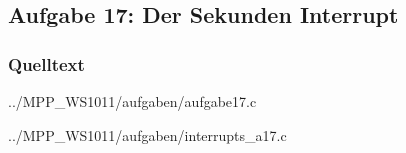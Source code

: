 \subsection*{Aufgabe 17: Der Sekunden Interrupt}

\subsubsection*{Quelltext}

{../MPP_WS1011/aufgaben/aufgabe17.c}


{../MPP_WS1011/aufgaben/interrupts_a17.c}
